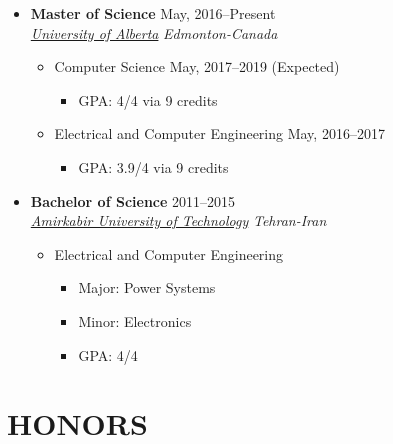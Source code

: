 \begin{itemize}
	\item \textbf{Master of Science} \hfill May, 2016--Present \\ 
	\href{https://ualberta.ca/}{ \emph{University of Alberta}} \hfill \emph{Edmonton-Canada}
	\begin{itemize}
		\item Computer Science \hspace{10 pt}  \hspace{10 pt}  \hfill  May, 2017–2019 (Expected)
		\begin{itemize}
			\item GPA: 4/4 via 9 credits \\
		\end{itemize}
		\item Electrical and Computer Engineering \hspace{10 pt}  \hspace{10 pt}  \hfill  May, 2016–2017 
		\begin{itemize}
			\item GPA: 3.9/4 via 9 credits \\
		\end{itemize}
	\end{itemize}
	
	
	\item \textbf{Bachelor of Science} \hfill 2011--2015 \\
	\href{http://aut.ac.ir/aut/}{ \emph{Amirkabir University of Technology}} \hfill \emph{Tehran-Iran}

	\begin{itemize}
		\item Electrical and Computer Engineering
		\begin{itemize}		
		\item Major: Power Systems \hspace{10 pt} 
		\item Minor: Electronics \hspace{36 pt}   
		\item GPA: 4/4
		\end{itemize}
	\end{itemize}

\end{itemize}
\section{HONORS}

